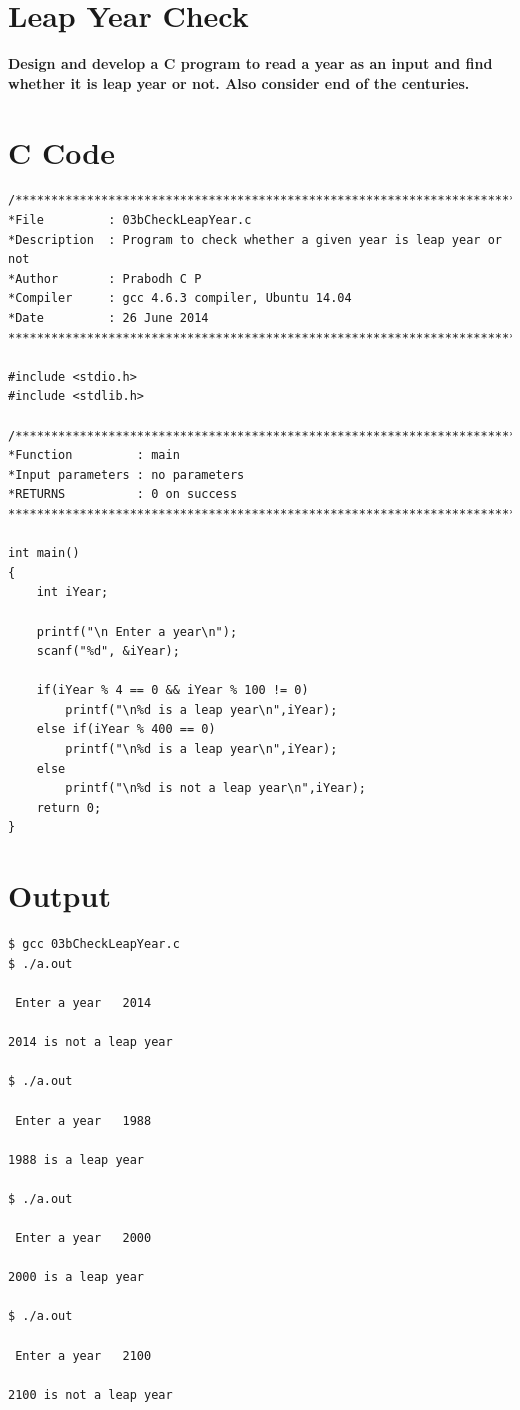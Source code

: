 \documentclass[a4paper]{report}
\begin{document}
\pagebreak
\section{Leap Year Check}
{\selectfont \textbf{Design and develop a C program to read a year as an input and find whether it is leap year or not. Also consider end of the centuries.
}}

\section*{C Code}

\begin{Verbatim}
/***************************************************************************
*File         : 03bCheckLeapYear.c
*Description  : Program to check whether a given year is leap year or not
*Author       : Prabodh C P
*Compiler     : gcc 4.6.3 compiler, Ubuntu 14.04
*Date         : 26 June 2014
***************************************************************************/

#include <stdio.h>
#include <stdlib.h>

/***************************************************************************
*Function         :	main
*Input parameters :	no parameters
*RETURNS          :	0 on success
***************************************************************************/

int main()
{
    int iYear;

    printf("\n Enter a year\n");
    scanf("%d", &iYear);

    if(iYear % 4 == 0 && iYear % 100 != 0)
        printf("\n%d is a leap year\n",iYear);
    else if(iYear % 400 == 0)
        printf("\n%d is a leap year\n",iYear);
    else
        printf("\n%d is not a leap year\n",iYear);
    return 0;
}
\end{Verbatim}

\pagebreak
\section*{Output}
\begin{Verbatim}
$ gcc 03bCheckLeapYear.c 
$ ./a.out 

 Enter a year	2014

2014 is not a leap year

$ ./a.out 

 Enter a year	1988

1988 is a leap year

$ ./a.out 

 Enter a year	2000

2000 is a leap year

$ ./a.out 

 Enter a year	2100

2100 is not a leap year

\end{Verbatim}
\end{document}
